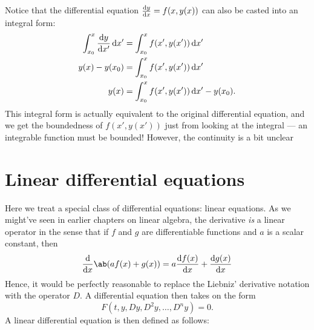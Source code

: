 Notice that the differential equation \(\odv{y}{x} = f(x, y(x))\) can also be casted
into an integral form:
\begin{align}
  \int_{x_0}^{x} \odv{y}{x'} \odif{x'} & = \int_{x_0}^x f(x', y(x')) \odif{x'}           \\
  y(x) - y(x_0)                        & = \int_{x_0}^x f(x', y(x')) \odif{x'}           \\
  y(x)                                 & = \int_{x_0}^x f(x', y(x')) \odif{x'} - y(x_0).
\end{align}
This integral form is actually equivalent to the original differential equation, and
we get the boundedness of \(f(x', y(x'))\) just from looking at the integral --- an
integrable function must be bounded! However, the continuity is a bit unclear

\section{Linear differential equations}

Here we treat a special class of differential equations: linear equations. As we might've
seen in earlier chapters on linear algebra, the derivative \emph{is} a linear operator in
the sense that if \(f\) and \(g\) are differentiable functions and \(a\) is a scalar constant, then
\begin{equation}
  \odv*{\ab(a f(x) + g(x))}{x} = a \odv{f(x)}{x} + \odv{g(x)}{x}
\end{equation}
Hence, it would be perfectly reasonable to replace the Liebniz' derivative notation
with the operator \(D\). A differential equation then takes on the form
\begin{equation}
  F(t, y, Dy, D^2 y, \dots, D^n y) = 0.
\end{equation}
A linear differential equation is then defined as follows:


